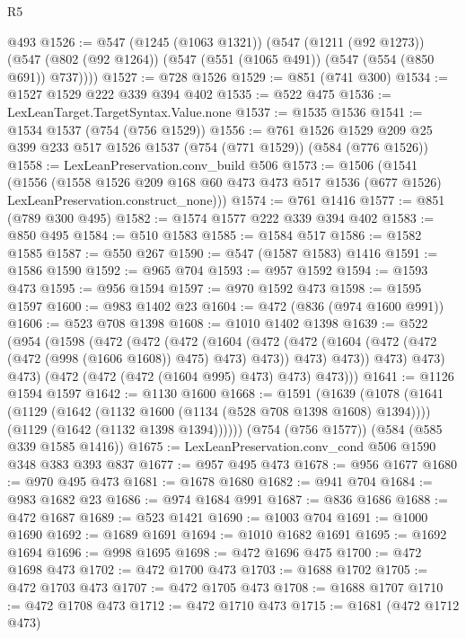 \begin{lexlean}{R5}
\begin{coremodule}
    @493
@1526 := @547
    (@1245 (@1063 @1321))
    (@547
      (@1211 (@92 @1273))
      (@547 (@802 (@92 @1264)) (@547 (@551 (@1065 @491)) (@547 (@554 (@850 @691)) @737))))
@1527 := @728 @1526
@1529 := @851 (@741 @300)
@1534 := @1527 @1529 @222 @339 @394 @402
@1535 := @522 @475
@1536 := LexLeanTarget.TargetSyntax.Value.none
@1537 := @1535 @1536
@1541 := @1534 @1537 (@754 (@756 @1529))
@1556 := @761
    @1526
    @1529
    @209
    @25
    @399
    @233
    @517
    @1526
    @1537
    (@754 (@771 @1529))
    (@584 (@776 @1526))
@1558 := LexLeanPreservation.conv_build @506
@1573 := @1506
    (@1541
      (@1556
        (@1558
          @1526
          @209
          @168
          @60
          @473
          @473
          @517
          @1536
          (@677 @1526)
          LexLeanPreservation.construct_none)))
@1574 := @761 @1416
@1577 := @851 (@789 @300 @495)
@1582 := @1574 @1577 @222 @339 @394 @402
@1583 := @850 @495
@1584 := @510 @1583
@1585 := @1584 @517
@1586 := @1582 @1585
@1587 := @550 @267
@1590 := @547 (@1587 @1583) @1416
@1591 := @1586 @1590
@1592 := @965 @704
@1593 := @957 @1592
@1594 := @1593 @473
@1595 := @956 @1594
@1597 := @970 @1592 @473
@1598 := @1595 @1597
@1600 := @983 @1402 @23
@1604 := @472 (@836 (@974 @1600 @991))
@1606 := @523 @708 @1398
@1608 := @1010 @1402 @1398
@1639 := @522
    (@954
      (@1598
        (@472
          (@472
            (@472
              (@1604
                (@472
                  (@472 (@1604 (@472 (@472 (@472 (@998 (@1606 @1608)) @475) @473) @473)) @473)
                  @473))
              @473)
            @473)
          @473)
        (@472 (@472 (@472 (@1604 @995) @473) @473) @473)))
@1641 := @1126 @1594 @1597
@1642 := @1130 @1600
@1668 := @1591
    (@1639
      (@1078
        (@1641
          (@1129 (@1642 (@1132 @1600 (@1134 (@528 @708 @1398 @1608) @1394))))
          (@1129 (@1642 (@1132 @1398 @1394))))))
    (@754 (@756 @1577))
    (@584 (@585 @339 @1585 @1416))
@1675 := LexLeanPreservation.conv_cond @506 @1590 @348 @383 @393 @837
@1677 := @957 @495 @473
@1678 := @956 @1677
@1680 := @970 @495 @473
@1681 := @1678 @1680
@1682 := @941 @704
@1684 := @983 @1682 @23
@1686 := @974 @1684 @991
@1687 := @836 @1686
@1688 := @472 @1687
@1689 := @523 @1421
@1690 := @1003 @704
@1691 := @1000 @1690
@1692 := @1689 @1691
@1694 := @1010 @1682 @1691
@1695 := @1692 @1694
@1696 := @998 @1695
@1698 := @472 @1696 @475
@1700 := @472 @1698 @473
@1702 := @472 @1700 @473
@1703 := @1688 @1702
@1705 := @472 @1703 @473
@1707 := @472 @1705 @473
@1708 := @1688 @1707
@1710 := @472 @1708 @473
@1712 := @472 @1710 @473
@1715 := @1681 (@472 @1712 @473)

\end{coremodule}
\end{lexlean}
